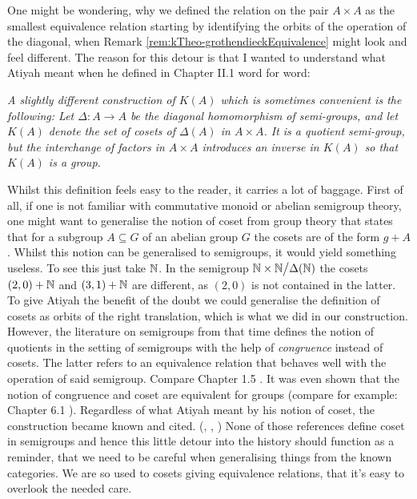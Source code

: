 \begin{remark} One might be wondering, why we defined the relation on the pair $A\times A$ as the smallest equivalence relation starting by identifying the orbits of the operation of the diagonal, when Remark \ref{rem:kTheo-grothendieckEquivalence} might look and feel different. The reason for this detour is that I wanted to understand what Atiyah meant when he defined in Chapter II.1 \cite{atiyah1989k} word for word: 

	\textit{ A slightly different construction of $K(A)$ which is sometimes convenient is the following: Let $\Delta: A\to A$ be the diagonal homomorphism of semi-groups, and let $K(A)$ denote the set of cosets of $\Delta(A)$ in $A\times A$. It is a quotient semi-group, but the interchange of factors in $A\times A$ introduces an inverse in $K(A)$ so that $K(A)$ is a group.}
	
	Whilst this definition feels easy to the reader, it carries a lot of baggage. First of all, if one is not familiar with commutative monoid or abelian semigroup theory, one might want to generalise the notion of coset from group theory that states that for a subgroup $A\subseteq G$ of an abelian group $G$ the cosets are of the form $g+A$. Whilst this notion can be generalised to semigroups, it would yield something useless. To see this just take $\mathbb{N}$. In the semigroup $\mathbb{N}\times \mathbb{N} \big/ \Delta(\mathbb{N})$ the cosets $(2,0)+\mathbb{N}$ and $(3,1)+\mathbb{N}$ are different, as $(2,0)$ is not contained in the latter. To give Atiyah the benefit of the doubt we could generalise the definition of cosets as orbits of the right translation, which is what we did in our construction. However, the literature on semigroups from that time defines the notion of quotients in the setting of semigroups with the help of \textit{congruence} instead of cosets. The latter refers to an equivalence relation that behaves well with the operation of said semigroup. Compare Chapter 1.5 \cite{CliffordPreston1961}. It was even shown that the notion of congruence and coset are equivalent for groups (compare for example: Chapter 6.1 \cite{Green1965}). Regardless of what Atiyah meant by his notion of coset, the construction became known and cited. (\cite{Brodzki1996}, \cite{Landweber2005}, \cite{Courtney2004}) None of those references define coset in semigroups and hence this little detour into the history should function as a reminder, that we need to be careful when generalising things from the known categories. We are so used to cosets giving equivalence relations, that it's easy to overlook the needed care. 
\end{remark}
